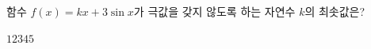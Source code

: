 함수 $f(x)=kx+3\sin x$가 극값을 갖지 않도록 하는 자연수 $k$의 최솟값은?
\begin{choices32}{$1$}{$2$}{$3$}{$4$}{$5$}\end{choices32}
